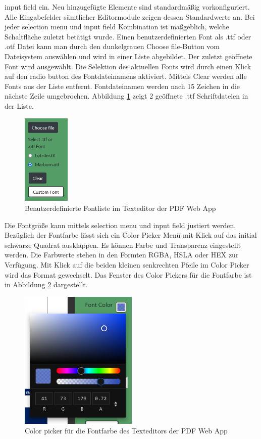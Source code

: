 input field ein. Neu hinzugefügte Elemente sind standardmäßig vorkonfiguriert. Alle Eingabefelder sämtlicher Editormodule zeigen dessen Standardwerte an. Bei jeder selection menu und input field Kombination ist maßgeblich, welche Schaltfläche zuletzt betätigt wurde. Einen benutzerdefinierten Font als .ttf oder .otf Datei kann man durch den dunkelgrauen Choose file-Button vom Dateisystem auswählen und wird in einer Liste abgebildet. Der zuletzt geöffnete Font wird ausgewählt. Die Selektion des aktuellen Fonts wird durch einen Klick auf den radio button des Fontdateinamens aktiviert. Mittels Clear werden alle Fonts aus der Liste entfernt. Fontdateinamen werden nach 15 Zeichen in die nächste Zeile umgebrochen. Abbildung \ref{fig:custom-font} zeigt 2 geöffnete .ttf Schriftdateien in der Liste.

\begin{figure}[!htbp]
	\centering
	\includegraphics[width=0.2\textwidth]{"images/custom-font.png"}
	\caption{Benutzerdefinierte Fontliste im Texteditor der PDF Web App}
	\label{fig:custom-font}
\end{figure}

Die Fontgröße kann mittels selection menu und input field justiert werden. Bezüglich der Fontfarbe lässt sich ein Color Picker Menü mit Klick auf das initial schwarze Quadrat ausklappen. Es können Farbe und Transparenz eingestellt werden. Die Farbwerte stehen in den Formten RGBA, HSLA oder HEX zur Verfügung. Mit Klick auf die beiden kleinen senkrechten Pfeile im Color Picker wird das Format gewechselt. Das Fenster des Color Pickers für die Fontfarbe ist in Abbildung \ref{fig:fontcolor} dargestellt. 

\begin{figure}[!htbp]
	\centering
	\includegraphics[width=0.5\textwidth]{"images/fontcolor.png"}
	\caption{Color picker für die Fontfarbe des Texteditors der PDF Web App}
	\label{fig:fontcolor}
\end{figure}

